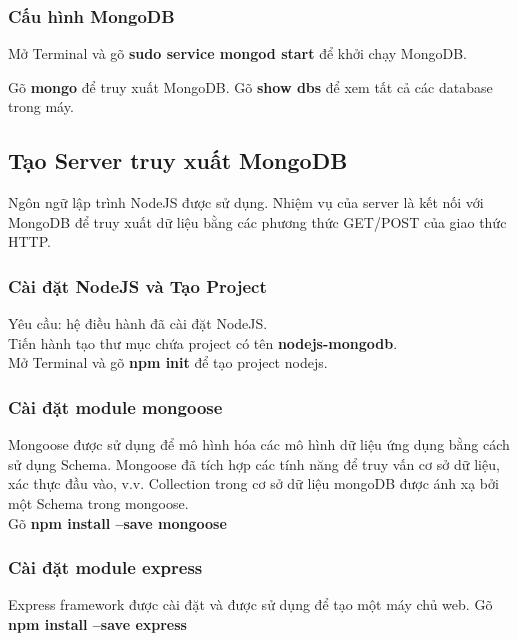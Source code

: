 \subsubsection{Cấu hình MongoDB}
Mở Terminal và gõ \textbf{sudo service mongod start} để khởi chạy MongoDB.\\
\label{ref{fig4_2}}

Gõ \textbf{mongo} để truy xuất MongoDB.
\label{ref{fig4_3}}
Gõ \textbf{show dbs} để xem tất cả các database trong máy.
\label{ref{fig4_4}}

\subsection{Tạo Server truy xuất MongoDB}
Ngôn ngữ lập trình NodeJS được sử dụng. Nhiệm vụ của server là kết nối với MongoDB để truy xuất dữ liệu bằng các phương thức GET/POST của giao thức HTTP.

\subsubsection{Cài đặt NodeJS và Tạo Project}
Yêu cầu: hệ điều hành đã cài đặt NodeJS.\\
Tiến hành tạo thư mục chứa project có tên \textbf{nodejs-mongodb}.\\
Mở Terminal và gõ \textbf{npm init} để tạo project nodejs.\\
\label{ref{fig4_5}}

\subsubsection{Cài đặt module mongoose}
Mongoose được sử dụng để mô hình hóa các mô hình dữ liệu ứng dụng bằng cách sử dụng Schema. Mongoose đã tích hợp các tính năng để truy vấn cơ sở dữ liệu, xác thực đầu vào, v.v. Collection trong cơ sở dữ liệu mongoDB được ánh xạ bởi một Schema trong mongoose.\\
Gõ \textbf{npm install --save mongoose}
\label{ref{fig4_6}}

\subsubsection{Cài đặt module express}
Express framework được cài đặt và được sử dụng để tạo một máy chủ web.
Gõ \textbf{npm install --save express}
\label{ref{fig4_7}}

